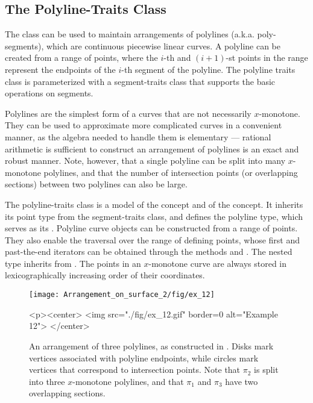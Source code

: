 \subsection{The Polyline-Traits Class\label{arr_ssec:tr_polylines}}

The  class can be used
to maintain arrangements of polylines (a.k.a. poly-segments),
which are continuous piecewise linear curves. A polyline can be
created from a range of points, where the $i$-th and $(i+1)$-st
points in the range represent the endpoints of the $i$-th segment
of the polyline. The polyline traits class is parameterized with a
segment-traits class that supports the basic operations on
segments.

Polylines are the simplest form of a curves that are not
necessarily $x$-monotone. They can be used to approximate more
complicated curves in a convenient manner, as the algebra needed
to handle them is elementary --- rational arithmetic is sufficient
to construct an arrangement of polylines is an exact and robust
manner. Note, however, that a single polyline can be split into
many $x$-monotone polylines, and that the number of intersection
points (or overlapping sections) between two polylines can also
be large. 

The polyline-traits class is a model of the 
concept and of the  concept.
It inherits its point type from the segment-traits class, and defines
the polyline type, which serves as its . Polyline curve
objects can be constructed from a range of points. They also enable
the traversal over the range of defining points, whose first and
past-the-end iterators can be obtained through the methods 
and . The nested  type inherits
from . The points in an $x$-monotone curve are
always stored in lexicographically increasing order of their
coordinates.

\begin{figure}[t]
\begin{ccTexOnly}
  \begin{center}
  \texttt{[image: Arrangement\_on\_surface\_2/fig/ex\_12]}
  \end{center}
\end{ccTexOnly}
\begin{ccHtmlOnly}
  <p><center>
  <img src="./fig/ex_12.gif" border=0 alt="Example 12">
  </center>
\end{ccHtmlOnly}
\caption{An arrangement of three polylines, as constructed in
. Disks mark vertices associated with
polyline endpoints, while circles mark vertices that correspond
to intersection points. Note that $\pi_2$ is split into three
$x$-monotone polylines, and that $\pi_1$ and $\pi_3$ have two
overlapping sections.\label{arr_fig:ex_12}}
\end{figure}

